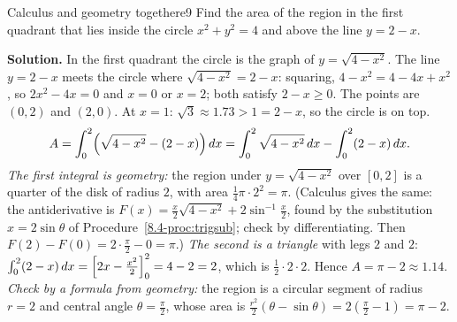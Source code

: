\documentclass[11pt]{article}
\begin{document}
\begin{exmp}{Calculus and geometry together}{e9}
Find the area of the region in the first quadrant that lies inside the circle $x^2+y^2=4$ and above the line $y=2-x$.

\textbf{Solution.} In the first quadrant the circle is the graph of $y=\sqrt{4-x^2}$. The line $y=2-x$ meets the circle where $\sqrt{4-x^2}=2-x$: squaring, $4-x^2=4-4x+x^2$, so $2x^2-4x=0$ and $x=0$ or $x=2$; both satisfy $2-x\ge0$. The points are $(0,2)$ and $(2,0)$. At $x=1$: $\sqrt3\approx1.73>1=2-x$, so the circle is on top.
\[
A=\int_0^2\Bigl(\sqrt{4-x^2}-(2-x)\Bigr)\,dx=\int_0^2\sqrt{4-x^2}\,dx-\int_0^2(2-x)\,dx .
\]
\emph{The first integral is geometry:} the region under $y=\sqrt{4-x^2}$ over $[0,2]$ is a quarter of the disk of radius $2$, with area $\frac14\pi\cdot2^2=\pi$. (Calculus gives the same: the antiderivative is $F(x)=\frac x2\sqrt{4-x^2}+2\sin^{-1}\frac x2$, found by the substitution $x=2\sin\theta$ of Procedure~\ref{8.4-proc:trigsub}; check by differentiating. Then $F(2)-F(0)=2\cdot\frac\pi2-0=\pi$.) \emph{The second is a triangle} with legs $2$ and $2$: $\int_0^2(2-x)\,dx=\Bigl[2x-\frac{x^2}2\Bigr]_0^2=4-2=2$, which is $\frac12\cdot2\cdot2$.
Hence $A=\pi-2\approx1.14$.
\emph{Check by a formula from geometry:} the region is a circular segment of radius $r=2$ and central angle $\theta=\frac\pi2$, whose area is $\frac{r^2}2(\theta-\sin\theta)=2\left(\frac\pi2-1\right)=\pi-2$. \checkmark


\end{exmp}
\end{document}
